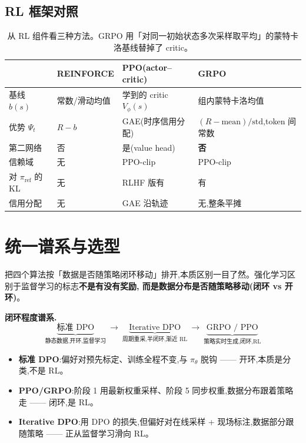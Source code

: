 \documentclass[11pt]{article}
\newcommand{\piref}{\pi_{\mathrm{ref}}}
\newcommand{\pith}{\pi_\theta}
\theoremstyle{plain}
\theoremstyle{definition}
\theoremstyle{remark}
\begin{document}
\subsection{RL 框架对照}

\begin{table}[h]\centering\small
\begin{tabular}{@{}llll@{}}
\toprule
 & REINFORCE & PPO(actor--critic) & GRPO\\
\midrule
基线 $b(s)$ & 常数/滑动均值 & 学到的 critic $V_\phi(s)$ & 组内蒙特卡洛均值\\
优势 $\Psi_t$ & $R-b$ & GAE(时序信用分配) & $(R-\text{mean})/\text{std}$,token 间常数\\
第二网络 & 否 & 是(value head) & \textbf{否}\\
信赖域 & 无 & PPO-clip & PPO-clip\\
对 $\piref$ 的 KL & 无 & RLHF 版有 & 有\\
信用分配 & 无 & GAE 沿轨迹 & 无,整条平摊\\
\bottomrule
\end{tabular}
\caption{从 RL 组件看三种方法。GRPO 用「对同一初始状态多次采样取平均」的蒙特卡洛基线替掉了 critic。}
\end{table}

\section{统一谱系与选型}

把四个算法按「数据是否随策略闭环移动」排开,本质区别一目了然。强化学习区别于监督学习的标志\textbf{不是有没有奖励,
而是数据分布是否随策略移动(闭环 vs 开环)}。

\begin{keybox}
\textbf{闭环程度谱系.}
\[
\underbrace{\text{标准 DPO}}_{\text{静态数据,开环,监督学习}}
\ \longrightarrow\
\underbrace{\text{Iterative DPO}}_{\text{周期重采,半闭环,渐近 RL}}
\ \longrightarrow\
\underbrace{\text{GRPO / PPO}}_{\text{策略实时生成,闭环,RL}}
\]
\begin{itemize}[topsep=2pt,itemsep=1pt]
\item \textbf{标准 DPO}:偏好对预先标定、训练全程不变,与 $\pith$ 脱钩 —— 开环,本质是分类,不是 RL。
\item \textbf{PPO/GRPO}:阶段 1 用最新权重采样、阶段 5 同步权重,数据分布跟着策略走 —— 闭环,是 RL。
\item \textbf{Iterative DPO}:用 DPO 的损失,但偏好对在线采样 + 现场标注,数据部分跟随策略 —— 正从监督学习滑向 RL。
\end{itemize}
\end{keybox}
\end{document}
